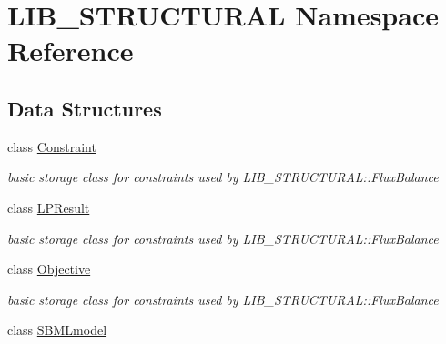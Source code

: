 \hypertarget{namespace_l_i_b___s_t_r_u_c_t_u_r_a_l}{}\section{L\+I\+B\+\_\+\+S\+T\+R\+U\+C\+T\+U\+R\+AL Namespace Reference}
\label{namespace_l_i_b___s_t_r_u_c_t_u_r_a_l}
\subsection*{Data Structures}
\begin{DoxyCompactItemize}
\item 
class \hyperlink{class_l_i_b___s_t_r_u_c_t_u_r_a_l_1_1_constraint}{Constraint}
\begin{DoxyCompactList}\small\item\em basic storage class for constraints used by L\+I\+B\+\_\+\+S\+T\+R\+U\+C\+T\+U\+R\+A\+L\+::\+Flux\+Balance \end{DoxyCompactList}\item 
class \hyperlink{class_l_i_b___s_t_r_u_c_t_u_r_a_l_1_1_l_p_result}{L\+P\+Result}
\begin{DoxyCompactList}\small\item\em basic storage class for constraints used by L\+I\+B\+\_\+\+S\+T\+R\+U\+C\+T\+U\+R\+A\+L\+::\+Flux\+Balance \end{DoxyCompactList}\item 
class \hyperlink{class_l_i_b___s_t_r_u_c_t_u_r_a_l_1_1_objective}{Objective}
\begin{DoxyCompactList}\small\item\em basic storage class for constraints used by L\+I\+B\+\_\+\+S\+T\+R\+U\+C\+T\+U\+R\+A\+L\+::\+Flux\+Balance \end{DoxyCompactList}\item 
class \hyperlink{class_l_i_b___s_t_r_u_c_t_u_r_a_l_1_1_s_b_m_lmodel}{S\+B\+M\+Lmodel}
\end{DoxyCompactItemize}
